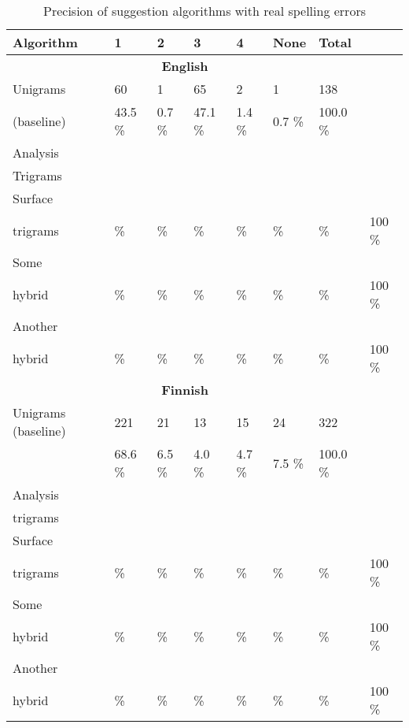 \documentclass[11pt,a4paper]{article}
\begin{document}
\begin{table*}[h]
  \begin{center}
    \caption{Precision of suggestion algorithms with real spelling errors
    \label{table:real-eval}}
    \begin{scriptsize}
      \begin{tabular}{l|llll|l|l|l}
        \hline
        Algorithm & 1 & 2 & 3 & 4 & None & Total \\
        \hline
        \multicolumn{7}{c}{\textbf{English}} \\
        \hline
        Unigrams 
& 60 & 1 & 65 & 2 & 1 & 138 \\
        (baseline) 
& 43.5 \% & 0.7 \% & 47.1 \% & 1.4 \% & 0.7 \%  & 100.0 \% \\
        \hline
        Analysis & & & & & & & \\
        Trigrams & & & & & & & \\
        \hline
        Surface  &       &      &      &      &       &       &     \\
        trigrams &    \% &   \% &   \% &   \% &    \% &    \% & 100 \% \\
        \hline
        Some     &       &      &      &      &       &       &     \\
        hybrid   &    \% &   \% &   \% &   \% &    \% &    \% & 100 \% \\
        \hline
        Another  &       &      &      &      &       &       &     \\
        hybrid   &    \% &   \% &   \% &   \% &    \% &    \% & 100 \% \\
        \hline
        \multicolumn{7}{c}{\textbf{Finnish}} \\
        \hline
        Unigrams  
        (baseline) 
& 221    & 21    & 13    & 15    & 24    & 322 \\
& 68.6 \% & 6.5 \% & 4.0 \% & 4.7 \% & 7.5 \% & 100.0 \% \\

        \hline
        Analysis
&       &      &      &      &       &       &     \\
        trigrams
&       &      &      &      &       &       &     \\
        \hline
        Surface  
&       &      &      &      &       &       &     \\
        trigrams 
&    \% &   \% &   \% &   \% &    \% &    \% & 100 \% \\
        \hline
        Some    
&       &      &      &      &       &       &     \\
        hybrid  
&    \% &   \% &   \% &   \% &    \% &    \% & 100 \% \\
        \hline
        Another  
&       &      &      &      &       &       &     \\
        hybrid   
&    \% &   \% &   \% &   \% &    \% &    \% & 100 \% \\
        \hline
      \end{tabular}
    \end{scriptsize}
  \end{center}
\end{table*}
\end{document}
